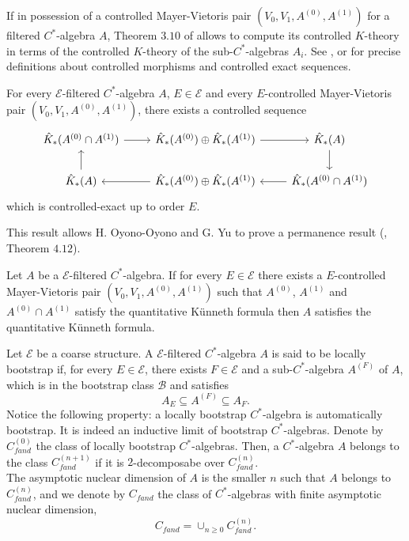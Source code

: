 If in possession of a controlled Mayer-Vietoris pair $(V_0, V_1, A^{(0)}, A^{(1)})$ for a filtered $C^*$-algebra $A$, Theorem $3.10$ of \cite{OY4} allows to compute its controlled $K$-theory in terms of the controlled $K$-theory of the sub-$C^*$-algebras $A_i$. See \cite{OY4},\cite{DellAieraThesis} or \cite{dell2017controlled} for precise definitions about controlled morphisms and controlled exact sequences. 

\begin{thm}
For every $\mathcal E$-filtered $C^*$-algebra $A$, $E\in \mathcal E$ and every $E$-controlled Mayer-Vietoris pair $(V_0, V_1, A^{(0)}, A^{(1)})$, there exists a controlled sequence
\[\begin{tikzcd}
 \hat K_*( A^{(0)}\cap A^{(1)} ) \arrow{r} & \hat K_*(A^{(0)}) \oplus \hat K_*(A^{(1)}) \arrow{r} & \hat K_*(A) \arrow{d} \\ 
 \hat K_*(A) \arrow{u} & \hat K_*(A^{(0)}) \oplus \hat K_*(A^{(1)}) \arrow{l} & \hat K_*( A^{(0)}\cap A^{(1)} ) \arrow{l}
\end{tikzcd}\]
which is controlled-exact up to order $E$.  
\end{thm}  

This result allows H. Oyono-Oyono and G. Yu to prove a permanence result (\cite{OY4}, Theorem $4.12$).

\begin{thm}
Let $A$ be a $\mathcal E$-filtered $C^*$-algebra. If for every $E\in \mathcal E$ there exists a $E$-controlled Mayer-Vietoris pair $(V_0, V_1, A^{(0)}, A^{(1)})$ such that $A^{(0)}$, $A^{(1)}$ and $A^{(0)} \cap A^{(1)}$ satisfy the quantitative Künneth formula then $A$ satisfies the quantitative Künneth formula.   
\end{thm}

Let $\mathcal E$ be a coarse structure. A $\mathcal E$-filtered $C^*$-algebra $A$ is said to be locally bootstrap if, for every $E\in \mathcal E$, there exists $F\in \mathcal E$ and a sub-$C^*$-algebra $A^{(F)}$ of $A$, which is in the bootstrap class $\mathcal B$ and satisfies
\[A_E \subseteq A^{(F)}\subseteq A_F. \]
Notice the following property: a locally bootstrap $C^*$-algebra is automatically bootstrap. It is indeed an inductive limit of bootstrap $C^*$-algebras. Denote by $C_{fand}^{(0)}$ the class of locally bootstrap $C^*$-algebras. Then, a $C^*$-algebra $A$ belongs to the class $C^{(n+1)}_{fand}$ if it is $2$-decomposabe over $C_{fand}^{(n)}$. \\

The asymptotic nuclear dimension of $A$ is the smaller $n$ such that $A$ belongs to $C^{(n)}_{fand}$, and we denote by $C_{fand}$ the class of $C^*$-algebras with finite asymptotic nuclear dimension,
\[ C_{fand}  = \cup_{n\geq 0} C_{fand}^{(n)}.\]

